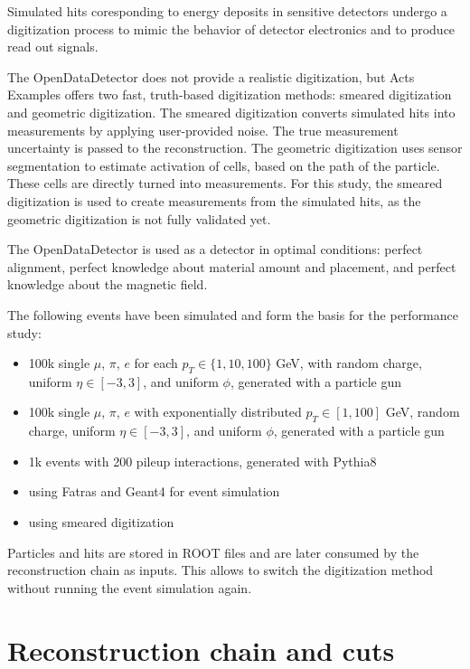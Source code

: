 Simulated hits coresponding to energy deposits in sensitive detectors undergo a digitization process to mimic the behavior of detector electronics and to produce read out signals.

The OpenDataDetector does not provide a realistic digitization, but Acts Examples offers two fast, truth-based digitization methods: smeared digitization and geometric digitization. The smeared digitization converts simulated hits into measurements by applying user-provided noise. The true measurement uncertainty is passed to the reconstruction. The geometric digitization uses sensor segmentation to estimate activation of cells, based on the path of the particle. These cells are directly turned into measurements. For this study, the smeared digitization is used to create measurements from the simulated hits, as the geometric digitization is not fully validated yet.

The OpenDataDetector is used as a detector in optimal conditions: perfect alignment, perfect knowledge about material amount and placement, and perfect knowledge about the magnetic field.

The following events have been simulated and form the basis for the performance study:
\begin{itemize}
    \item 100k single $\mu$, $\pi$, $e$ for each $p_T \in \{1,10,100\}$ GeV, with random charge, uniform $\eta \in [-3,3]$, and uniform $\phi$, generated with a particle gun
    \item 100k single $\mu$, $\pi$, $e$ with exponentially distributed $p_T \in [1,100]$ GeV, random charge, uniform $\eta \in [-3,3]$, and uniform $\phi$, generated with a particle gun
    \item 1k \ttbar events with 200 pileup interactions, generated with Pythia8
    \item using Fatras and Geant4 for event simulation
    \item using smeared digitization
\end{itemize}

Particles and hits are stored in ROOT \cite{root} files and are later consumed by the reconstruction chain as inputs. This allows to switch the digitization method without running the event simulation again.

\section{Reconstruction chain and cuts}

